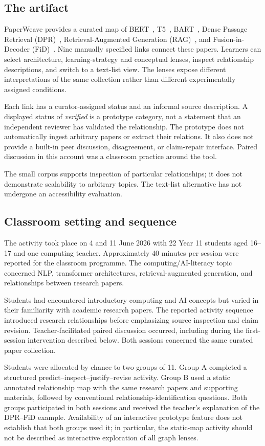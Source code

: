 \subsection{The artifact}
PaperWeave provides a curated map of BERT~\cite{bert}, T5~\cite{t5}, BART~\cite{bart}, Dense Passage Retrieval (DPR)~\cite{dpr}, Retrieval-Augmented Generation (RAG)~\cite{rag}, and Fusion-in-Decoder (FiD)~\cite{fid}. Nine manually specified links connect these papers. Learners can select architecture, learning-strategy and conceptual lenses, inspect relationship descriptions, and switch to a text-list view. The lenses expose different interpretations of the same collection rather than different experimentally assigned conditions.

Each link has a curator-assigned status and an informal source description. A displayed status of \emph{verified} is a prototype category, not a statement that an independent reviewer has validated the relationship. The prototype does not automatically ingest arbitrary papers or extract their relations. It also does not provide a built-in peer discussion, disagreement, or claim-repair interface. Paired discussion in this account was a classroom practice around the tool.

The small corpus supports inspection of particular relationships; it does not demonstrate scalability to arbitrary topics. The text-list alternative has not undergone an accessibility evaluation.

\subsection{Classroom setting and sequence}
The activity took place on 4 and 11 June 2026 with 22 Year 11 students aged 16--17 and one computing teacher. Approximately 40 minutes per session were reported for the classroom programme. The computing/AI-literacy topic concerned NLP, transformer architectures, retrieval-augmented generation, and relationships between research papers.

Students had encountered introductory computing and AI concepts but varied in their familiarity with academic research papers. The reported activity sequence introduced research relationships before emphasizing source inspection and claim revision. Teacher-facilitated paired discussion occurred, including during the first-session intervention described below. Both sessions concerned the same curated paper collection.

Students were allocated by chance to two groups of 11. Group A completed a structured predict--inspect--justify--revise activity. Group B used a static annotated relationship map with the same research papers and supporting materials, followed by conventional relationship-identification questions. Both groups participated in both sessions and received the teacher's explanation of the DPR--FiD example. Availability of an interactive prototype feature does not establish that both groups used it; in particular, the static-map activity should not be described as interactive exploration of all graph lenses.

